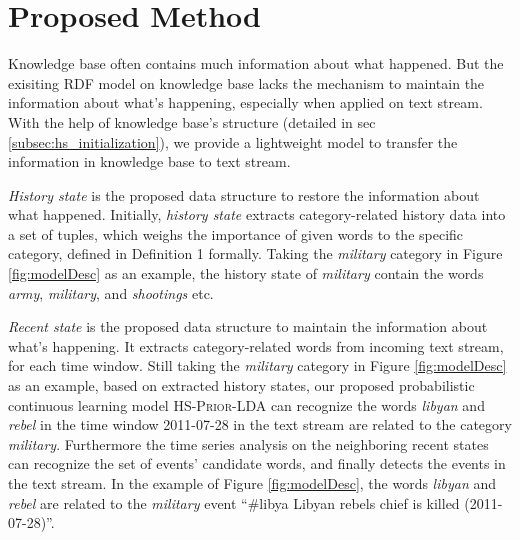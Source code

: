 \documentclass{article}
\begin{document}

\section{Proposed Method}
Knowledge base often contains much information about what happened. 
But the exisiting RDF model\cite{klyne2006rdf} on knowledge base lacks the mechanism to maintain the information about what's happening, especially when applied on text stream.  
With the help of knowledge base's structure (detailed in sec \ref{subsec:hs_initialization}), we provide a  lightweight model to transfer the information in knowledge base to text stream.

\textit{History state} is the proposed data structure to restore the information about what happened. 
Initially, \textit{history state} extracts category-related history data into a set of tuples, which weighs the importance of given words to the specific category, defined in Definition 1 formally. 
Taking the \textit{military} category in Figure \ref{fig:modelDesc} as an example, the history state of \textit{military} contain the words \textit{army}, \textit{military}, and \textit{shootings} etc. 

\textit{Recent state} is the proposed data structure to maintain the information about what's happening.
It extracts category-related words from incoming text stream, for each time window.
Still taking the \textit{military} category in  Figure \ref{fig:modelDesc} as an example, based on extracted history states, our proposed probabilistic continuous learning model \textsc{HS-Prior-LDA} can recognize the words \textit{libyan} and \textit{rebel} in the time window 2011-07-28 in the text stream are related to the category \textit{military}. 
Furthermore the time series analysis on the neighboring recent states can recognize the set of events' candidate words, and finally detects the events in the text stream. 
In the example of Figure \ref{fig:modelDesc}, the words \textit{libyan} and \textit{rebel} are related to the \textit{military} event ``\#libya Libyan rebels chief is killed (2011-07-28)''.
\end{document}
